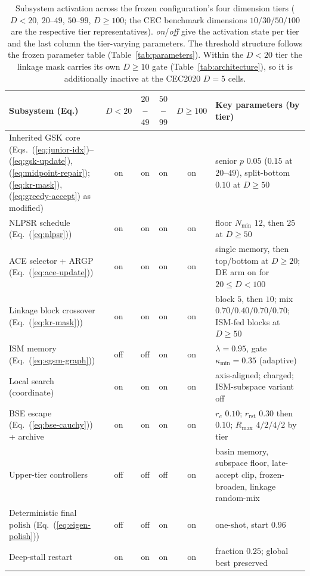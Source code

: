 \begin{table}[t]
\caption{Subsystem activation across the frozen configuration's four
dimension tiers ($D<20$, $20$--$49$, $50$--$99$, $D\geq100$; the CEC benchmark
dimensions $10/30/50/100$ are the respective tier representatives).
\emph{on}/\emph{off} give the activation state per tier and the last column the
tier-varying parameters. The threshold structure follows the frozen parameter
table (Table~\ref{tab:parameters}). Within the $D{<}20$ tier the linkage mask
carries its own $D\geq10$ gate (Table~\ref{tab:architecture}), so it is
additionally inactive at the CEC2020 $D=5$ cells.}
\label{tab:dim-gating}
\centering
\footnotesize
\zebra
\begin{tabular}{p{3.2cm}cccc p{3.9cm}}
\toprule
\textbf{Subsystem (Eq.)} & \textbf{$D{<}20$} & \textbf{$20$--$49$} & \textbf{$50$--$99$} & \textbf{$D{\ge}100$} & \textbf{Key parameters (by tier)} \\
\midrule
Inherited GSK core (Eqs.~(\ref{eq:junior-idx})--(\ref{eq:gsk-update}), (\ref{eq:midpoint-repair}); (\ref{eq:kr-mask}), (\ref{eq:greedy-accept}) as modified) & on & on & on & on & senior $p$ $0.05$ ($0.15$ at $20$--$49$), split-bottom $0.10$ at $D{\ge}50$ \\
NLPSR schedule (Eq.~(\ref{eq:nlpsr})) & on & on & on & on & floor $N_{\min}$ $12$, then $25$ at $D{\ge}50$ \\
ACE selector + ARGP (Eq.~(\ref{eq:ace-update})) & on & on & on & on & single memory, then top/bottom at $D{\ge}20$; DE arm on for $20{\le}D{<}100$ \\
Linkage block crossover (Eq.~(\ref{eq:kr-mask})) & on & on & on & on & block $5$, then $10$; mix $0.70/0.40/0.70/0.70$; ISM-fed blocks at $D{\ge}50$ \\
ISM memory (Eq.~(\ref{eq:sgsm-graph})) & off & off & on & on & $\lambda{=}0.95$, gate $\kappa_{\min}{=}0.35$ (adaptive) \\
Local search (coordinate) & on & on & on & on & axis-aligned; charged; ISM-subspace variant off \\
BSE escape (Eq.~(\ref{eq:bse-cauchy})) + archive & on & on & on & on & $r_{c}$ $0.10$; $r_{\mathrm{rst}}$ $0.30$ then $0.10$; $R_{\max}$ $4/2/4/2$ by tier \\
Upper-tier controllers & off & off & off & on & basin memory, subspace floor, late-accept clip, frozen-broaden, linkage random-mix \\
Deterministic final polish (Eq.~(\ref{eq:eigen-polish})) & off & off & on & on & one-shot, start $0.96$ \\
Deep-stall restart & on & on & on & on & fraction $0.25$; global best preserved \\
\bottomrule
\end{tabular}
\end{table}

